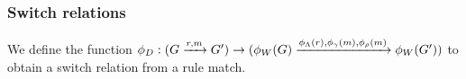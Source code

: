 \subsubsection{Switch relations}
We define the function $\phi_D: (G \xrightarrow{r, m} G') \rightarrow (\phi_W(G)\xrightarrow{\phi_\Lambda(r), \phi_\gamma(m), \phi_\rho(m)}\phi_W(G'))$ to obtain a switch relation from a rule match. 

